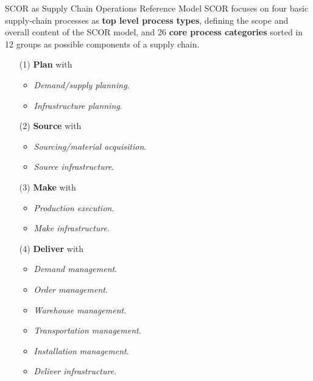 \documentclass{beamer}
\begin{document}
\begin{frame}{SCOR as Supply Chain Operations Reference Model}
SCOR focuses on four basic supply-chain processes as \textbf{top level process
  types}, defining the scope and overall content of the SCOR model, and 26
\textbf{core process categories} sorted in 12 groups as possible components of
a supply chain.

\begin{minipage}[t]{.45\textwidth}\small\raggedright
\begin{itemize}
\item[(1)] \textbf{Plan} with
  \begin{itemize}[leftmargin=0pt]
  \item \emph{Demand/supply planning}.
  \item \emph{Infrastructure planning}. 
  \end{itemize}
\item[(2)] \textbf{Source} with
  \begin{itemize}[leftmargin=0pt]
  \item \emph{Sourcing/material acquisition}.
  \item \emph{Source infrastructure}.  
  \end{itemize}
\item[(3)] \textbf{Make} with
  \begin{itemize}[leftmargin=0pt]
  \item \emph{Production execution}.
  \item \emph{Make infrastructure}. 
  \end{itemize}
\end{itemize}
\end{minipage}\hfill
\begin{minipage}[t]{.45\textwidth}\small\raggedright
\begin{itemize}
\item[(4)] \textbf{Deliver} with
  \begin{itemize}[leftmargin=0pt]
  \item \emph{Demand management}.
  \item \emph{Order management}.
  \item \emph{Warehouse management}.
  \item \emph{Transportation management}.
  \item \emph{Installation management}.
  \item \emph{Deliver infrastructure}.
  \end{itemize}
\end{itemize}
\end{minipage}
\end{frame}
\end{document}
